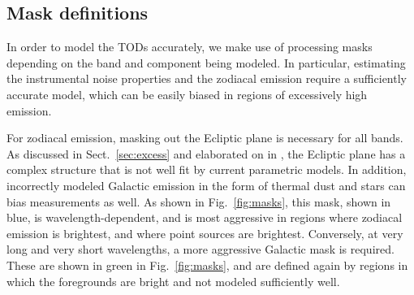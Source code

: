 \documentclass{aa}
\begin{document}


\subsection{Mask definitions}


In order to model the TODs accurately, we make use of processing masks depending on the band and component being modeled. In particular, estimating the instrumental noise properties and the zodiacal emission require a sufficiently accurate model, which can be easily biased in regions of excessively high emission.

For zodiacal emission, masking out the Ecliptic plane is necessary for all bands. As discussed in Sect.~\ref{sec:excess} and elaborated on in \citet{CG02_02}, the Ecliptic plane has a complex structure that is not well fit by current parametric models. In addition, incorrectly modeled Galactic emission in the form of thermal dust and stars can bias measurements as well. As shown in Fig.~\ref{fig:masks}, this mask, shown in blue, is wavelength-dependent, and is most aggressive in regions where zodiacal emission is brightest, and where point sources are brightest.
Conversely, at very long and very short wavelengths, a more aggressive Galactic mask is required. These are shown in green in Fig.~\ref{fig:masks}, and are defined again by regions in which the foregrounds are bright and not modeled sufficiently well.



\end{document}

